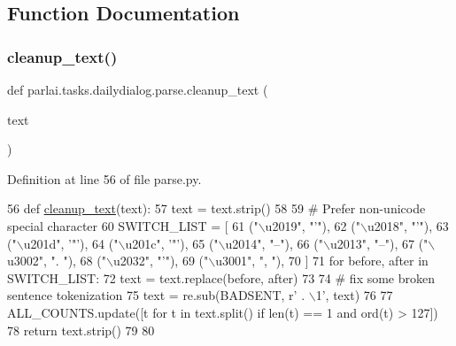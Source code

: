 \subsection{Function Documentation}
\mbox{\label{namespaceparlai_1_1tasks_1_1dailydialog_1_1parse_a9bee736957d0b4eb0a046855faa821dc}} 
\subsubsection{\texorpdfstring{cleanup\+\_\+text()}{cleanup\_text()}}
{\footnotesize\ttfamily def parlai.\+tasks.\+dailydialog.\+parse.\+cleanup\+\_\+text (\begin{DoxyParamCaption}\item[{}]{text }\end{DoxyParamCaption})}



Definition at line 56 of file parse.\+py.


\begin{DoxyCode}
56 \textcolor{keyword}{def }\hyperlink{namespaceparlai_1_1tasks_1_1dailydialog_1_1parse_a9bee736957d0b4eb0a046855faa821dc}{cleanup\_text}(text):
57     text = text.strip()
58 
59     \textcolor{comment}{# Prefer non-unicode special character}
60     SWITCH\_LIST = [
61         (\textcolor{stringliteral}{"\(\backslash\)u2019"}, \textcolor{stringliteral}{"'"}),
62         (\textcolor{stringliteral}{"\(\backslash\)u2018"}, \textcolor{stringliteral}{"'"}),
63         (\textcolor{stringliteral}{"\(\backslash\)u201d"}, \textcolor{stringliteral}{'"'}),
64         (\textcolor{stringliteral}{"\(\backslash\)u201c"}, \textcolor{stringliteral}{'"'}),
65         (\textcolor{stringliteral}{"\(\backslash\)u2014"}, \textcolor{stringliteral}{"--"}),
66         (\textcolor{stringliteral}{"\(\backslash\)u2013"}, \textcolor{stringliteral}{"--"}),
67         (\textcolor{stringliteral}{"\(\backslash\)u3002"}, \textcolor{stringliteral}{". "}),
68         (\textcolor{stringliteral}{"\(\backslash\)u2032"}, \textcolor{stringliteral}{"'"}),
69         (\textcolor{stringliteral}{"\(\backslash\)u3001"}, \textcolor{stringliteral}{", "}),
70     ]
71     \textcolor{keywordflow}{for} before, after \textcolor{keywordflow}{in} SWITCH\_LIST:
72         text = text.replace(before, after)
73 
74     \textcolor{comment}{# fix some broken sentence tokenization}
75     text = re.sub(BADSENT, \textcolor{stringliteral}{r' . \(\backslash\)1'}, text)
76 
77     ALL\_COUNTS.update([t \textcolor{keywordflow}{for} t \textcolor{keywordflow}{in} text.split() \textcolor{keywordflow}{if} len(t) == 1 \textcolor{keywordflow}{and} ord(t) > 127])
78     \textcolor{keywordflow}{return} text.strip()
79 
80 
\end{DoxyCode}


